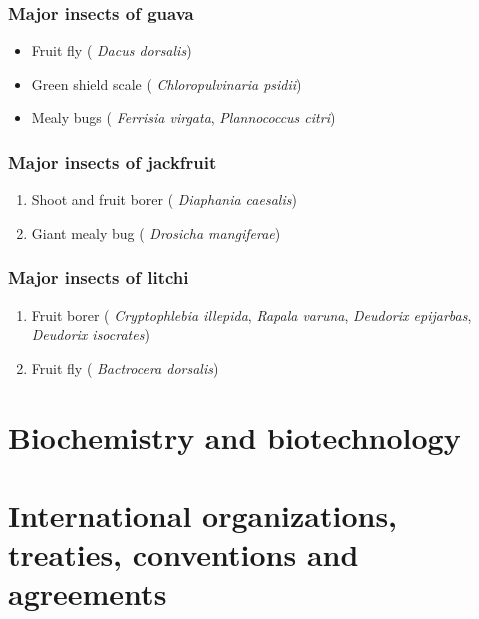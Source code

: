 \documentclass[
  openany]{book}
\providecommand{\tightlist}{%
  \setlength{\itemsep}{0pt}\setlength{\parskip}{0pt}}
\begin{document}
\hypertarget{major-insects-of-guava}{%
\subsection{Major insects of guava}\label{major-insects-of-guava}}

\begin{itemize}
\tightlist
\item
  Fruit fly ( \emph{Dacus dorsalis})
\item
  Green shield scale ( \emph{Chloropulvinaria psidii})
\item
  Mealy bugs ( \emph{Ferrisia virgata}, \emph{Plannococcus citri})
\end{itemize}

\hypertarget{major-insects-of-jackfruit}{%
\subsection{Major insects of jackfruit}\label{major-insects-of-jackfruit}}

\begin{enumerate}
\def\labelenumi{\arabic{enumi}.}
\tightlist
\item
  Shoot and fruit borer ( \emph{Diaphania caesalis})
\item
  Giant mealy bug ( \emph{Drosicha mangiferae})
\end{enumerate}

\hypertarget{major-insects-of-litchi}{%
\subsection{Major insects of litchi}\label{major-insects-of-litchi}}

\begin{enumerate}
\def\labelenumi{\arabic{enumi}.}
\tightlist
\item
  Fruit borer ( \emph{Cryptophlebia illepida}, \emph{Rapala varuna}, \emph{Deudorix epijarbas}, \emph{Deudorix isocrates})
\item
  Fruit fly ( \emph{Bactrocera dorsalis})
\end{enumerate}

\hypertarget{biochemistry-and-biotechnology}{%
\chapter{Biochemistry and biotechnology}\label{biochemistry-and-biotechnology}}

\hypertarget{international-organizations-treaties-conventions-and-agreements}{%
\chapter{International organizations, treaties, conventions and agreements}\label{international-organizations-treaties-conventions-and-agreements}}
\end{document}
